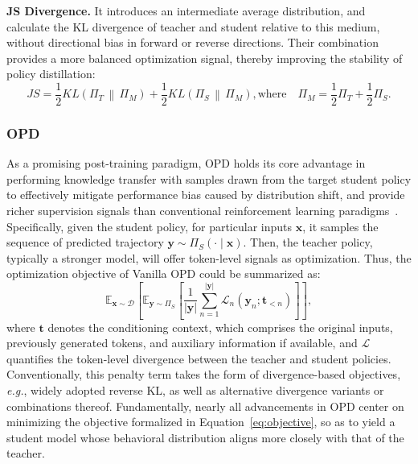 \documentclass{llmxive}
\begin{document}
\noindent\textbf{JS Divergence.}
It introduces an intermediate average distribution, and calculate the KL divergence of teacher and student relative to this medium, without directional bias in forward or reverse directions. 
Their combination provides a more balanced optimization signal, thereby improving the stability of policy distillation:
\begin{equation}
    JS = \frac{1}{2} KL\left( \Pi_T \,\middle\|\, \Pi_M \right) + \frac{1}{2}KL\left(\Pi_S\,\middle\|\,\Pi_M\right),
    \text{where} \quad \Pi_M = \frac{1}{2} \Pi_T + \frac{1}{2} \Pi_S.
\end{equation}



\subsubsection{OPD}
As a promising post-training paradigm, OPD holds its core advantage in performing knowledge transfer with samples drawn from the target student policy to effectively mitigate performance bias caused by distribution shift, and provide richer supervision signals than conventional reinforcement learning paradigms~\citep{thinking2025opd,song2026survey,li2026rethinking}. Specifically, given the student policy, for particular inputs $\mathbf{x}$, it samples the sequence of predicted trajectory $\mathbf{y}\sim\Pi_{S}\left(\cdot\mid\mathbf{x}\right)$. Then, the teacher policy, typically a stronger model, will offer token-level signals as optimization. Thus, the optimization objective of Vanilla OPD could be summarized as:
\begin{equation}
    \mathbb{E}_{\mathbf{x} \sim \mathcal{D}}\left[\mathbb{E}_{\mathbf{y} \sim \Pi_{S}}\left[\frac{1}{|\mathbf{y}|} \sum_{n=1}^{|\mathbf{y}|} \mathcal{L}_{n}\left(\mathbf{y}_{n} ; \mathbf{t}_{<n}\right)\right]\right],
    \label{eq:objective}
\end{equation}
where $\mathbf{t}$ denotes the conditioning context, which comprises the original inputs, previously generated tokens, and auxiliary information if available, and $\mathcal{L}$ quantifies the token-level divergence between the teacher and student policies. Conventionally, this penalty term takes the form of divergence-based objectives, \textit{e.g.}, widely adopted reverse KL, as well as alternative divergence variants or combinations thereof. Fundamentally, nearly all advancements in OPD center on minimizing the objective formalized in Equation~\ref{eq:objective}, so as to yield a student model whose behavioral distribution aligns more closely with that of the teacher.
\end{document}
